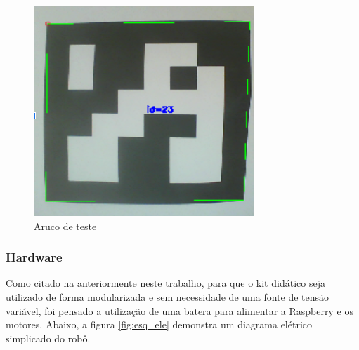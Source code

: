 \begin{figure}[H]
	\centering
	\includegraphics[scale=0.8, angle=0]{Figures/aruco1.png}
	\caption{Aruco de teste}
	\label{fig:aruco1}
\end{figure}


\subsubsection{Hardware}
Como citado na anteriormente neste trabalho, para que o kit didático seja utilizado de forma modularizada e sem necessidade de uma fonte de tensão variável, foi pensado a utilização de uma batera para alimentar a Raspberry e os motores. Abaixo, a figura \ref{fig:esq_ele} demonstra um diagrama elétrico simplicado do robô.

